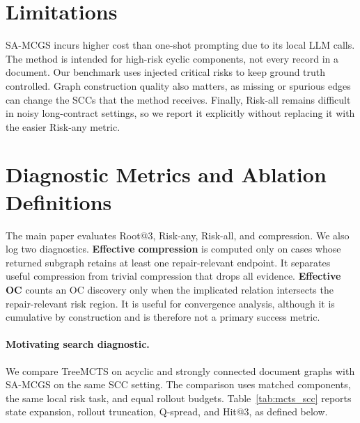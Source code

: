 \documentclass[11pt]{article}
\makeatletter
\newcommand{\samcgs}{SA-MCGS}
\newcommand{\riskany}{Risk-any}
\newcommand{\riskall}{Risk-all}
\newcommand{\rootthree}{Root@3}
\newcommand{\scc}{SCC}
\newcommand{\oc}{OC}
\makeatother
\begin{document}
\section*{Limitations}
\label{sec:limitations}

\samcgs{} incurs higher cost than one-shot prompting due to its local LLM calls.  The method is intended for high-risk cyclic components, not every record in a document.  Our benchmark uses injected critical risks to keep ground truth controlled.   Graph construction quality also matters, as missing or spurious edges can change the \scc{}s that the method receives.  Finally, \riskall{} remains difficult in noisy long-contract settings, so we report it explicitly without replacing it with the easier \riskany{} metric. 



\appendix
\raggedbottom


\section{Diagnostic Metrics and Ablation Definitions}
\label{app:diagnostics}

The main paper evaluates \rootthree{}, \riskany{}, \riskall{}, and
compression.  We also log two diagnostics.  \textbf{Effective
compression} is computed only on cases whose returned subgraph retains at
least one repair-relevant endpoint.  It separates useful compression from
trivial compression that drops all evidence.  \textbf{Effective \oc{}}
counts an \oc{} discovery only when the implicated relation intersects
the repair-relevant risk region.  It is useful for convergence analysis,
although it is cumulative by construction and is therefore not a primary
success metric.

\begin{revredblock}
\paragraph{Motivating search diagnostic.}
We compare TreeMCTS on acyclic and strongly connected document graphs with \samcgs{} on the same \scc{} setting. The comparison uses matched components, the same local risk task, and equal rollout budgets. Table~\ref{tab:mcts_scc} reports state expansion, rollout truncation, Q-spread, and Hit@3, as defined below.


\end{revredblock}
\end{document}
